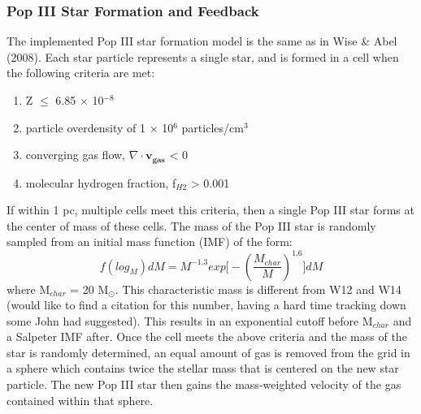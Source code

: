 \documentclass[a4paper,fleqn,usenatbib]{mnras}
\begin{document}
\subsubsection{Pop III Star Formation and Feedback }
The implemented Pop III star formation model is the same as in Wise \& Abel (2008). Each star particle represents a single star, and is formed in a cell when the following criteria are met: 
\begin{enumerate}
	\item Z $\leq$ 6.85 $\times$ 10$^{-8}$

	\item particle overdensity of 1 $\times$ 10$^{6}$ 
		particles/cm$^{3}$

	\item converging gas flow, $\nabla \cdot \mathbf{v_{gas}}$ < 0 

	\item molecular hydrogen fraction, f$_{H2}$ > 0.001
\end{enumerate}

If within 1 pc, multiple cells meet this criteria, then a single Pop III star forms at the center of mass of these cells. The mass of the Pop III star is randomly sampled from an initial mass function (IMF) of the form:
\begin{equation}
	f(log_{M})dM = M^{-1.3}exp \Big[-\left( \frac{M_{char}}{M}\right)^{1.6} \Big]dM
\end{equation}
where M$_{char}$ = 20 M$_{\odot}$. This characteristic mass is different from W12 and W14 (would like to find a citation for this number, having a hard time tracking down some John had suggested). This results in an exponential cutoff before M$_{char}$ and a Salpeter IMF after. Once the cell meets the above criteria and the mass of the star is randomly determined, an equal amount of gas is removed from the grid in a sphere which contains twice the stellar mass that is centered on the new star particle. The new Pop III star then gains the mass-weighted velocity of the gas contained within that sphere.  
\end{document}
